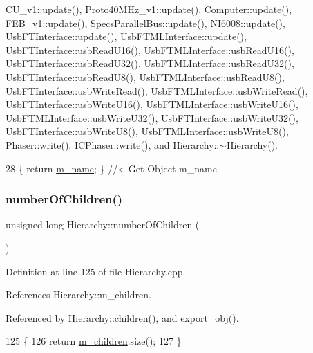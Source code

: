 C\+U\+\_\+v1\+::update(), Proto40\+M\+Hz\+\_\+v1\+::update(), Computer\+::update(), F\+E\+B\+\_\+v1\+::update(), Specs\+Parallel\+Bus\+::update(), N\+I6008\+::update(), Usb\+F\+T\+Interface\+::update(), Usb\+F\+T\+M\+L\+Interface\+::update(), Usb\+F\+T\+Interface\+::usb\+Read\+U16(), Usb\+F\+T\+M\+L\+Interface\+::usb\+Read\+U16(), Usb\+F\+T\+Interface\+::usb\+Read\+U32(), Usb\+F\+T\+M\+L\+Interface\+::usb\+Read\+U32(), Usb\+F\+T\+Interface\+::usb\+Read\+U8(), Usb\+F\+T\+M\+L\+Interface\+::usb\+Read\+U8(), Usb\+F\+T\+Interface\+::usb\+Write\+Read(), Usb\+F\+T\+M\+L\+Interface\+::usb\+Write\+Read(), Usb\+F\+T\+Interface\+::usb\+Write\+U16(), Usb\+F\+T\+M\+L\+Interface\+::usb\+Write\+U16(), Usb\+F\+T\+M\+L\+Interface\+::usb\+Write\+U32(), Usb\+F\+T\+Interface\+::usb\+Write\+U32(), Usb\+F\+T\+Interface\+::usb\+Write\+U8(), Usb\+F\+T\+M\+L\+Interface\+::usb\+Write\+U8(), Phaser\+::write(), I\+C\+Phaser\+::write(), and Hierarchy\+::$\sim$\+Hierarchy().


\begin{DoxyCode}
28 \{ \textcolor{keywordflow}{return} \hyperlink{classObject_a8b83c95c705d2c3ba0d081fe1710f48d}{m\_name}; \} \textcolor{comment}{//< Get Object m\_name}
\end{DoxyCode}
\mbox{\label{classHierarchy_ab16e84de65fd84e14001a6cf941c8be4}} 
\subsubsection{\texorpdfstring{number\+Of\+Children()}{numberOfChildren()}}
{\footnotesize\ttfamily unsigned long Hierarchy\+::number\+Of\+Children (\begin{DoxyParamCaption}{ }\end{DoxyParamCaption})\hspace{0.3cm}{\ttfamily [inherited]}}



Definition at line 125 of file Hierarchy.\+cpp.



References Hierarchy\+::m\+\_\+children.



Referenced by Hierarchy\+::children(), and export\+\_\+obj().


\begin{DoxyCode}
125                                            \{
126   \textcolor{keywordflow}{return} \hyperlink{classHierarchy_a038816763941fd4a930504917f60483b}{m\_children}.size();
127 \}
\end{DoxyCode}
\mbox{\label{classHierarchy_aee461dc930ce3871636ff87f075b1b83}} 
